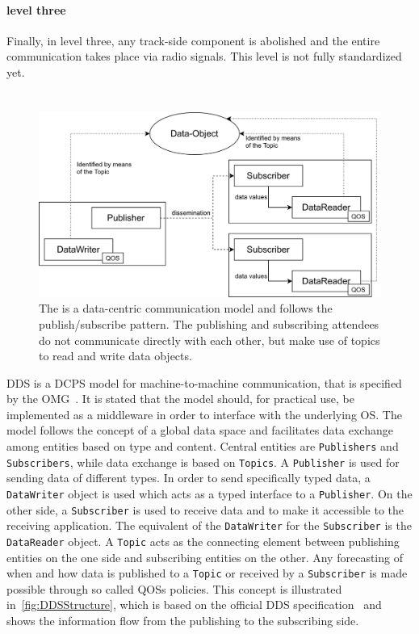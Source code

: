 \paragraph{ level three}
Finally, in  level three, any track-side component is abolished and the entire communication takes place via radio signals.
This  level is not fully standardized yet.

\section{}

\begin{figure}[!hb]
	\centering
	\includegraphics[width=0.75\linewidth]{images/DDSStructure}
	\caption{The  is a data-centric communication model and follows the publish/subscribe pattern. The publishing and subscribing attendees do not communicate directly with each other, but make use of topics to read and write data objects.}
	\label{fig:DDSStructure}
\end{figure}

\Gls*{DDS} is a \gls*{DCPS} model for machine-to-machine communication, that is specified by the \gls*{OMG}~\cite{omgDDSspec}.
It is stated that the model should, for practical use, be implemented as a middleware in order to interface with the underlying \gls*{OS}.
The model follows the concept of a global data space and facilitates data exchange among entities based on type and content.
Central entities are \texttt{Publishers} and \texttt{Subscribers}, while data exchange is based on \texttt{Topics}.
A \texttt{Publisher} is used for sending data of different types.
In order to send specifically typed data, a \texttt{DataWriter} object is used which acts as a typed interface to a \texttt{Publisher}.
On the other side, a \texttt{Subscriber} is used to receive data and to make it accessible to the receiving application.
The equivalent of the \texttt{DataWriter} for the \texttt{Subscriber} is the \texttt{DataReader} object.
A \texttt{Topic} acts as the connecting element between publishing entities on the one side and subscribing entities on the other.
Any forecasting of when and how data is published to a \texttt{Topic} or received by a \texttt{Subscriber} is made possible through so called \glspl*{QOS} policies.
This concept is illustrated in~\autoref{fig:DDSStructure}, which is based on the official \gls*{DDS} specification~\cite{omgDDSspec} and shows the information flow from the publishing to the subscribing side.

